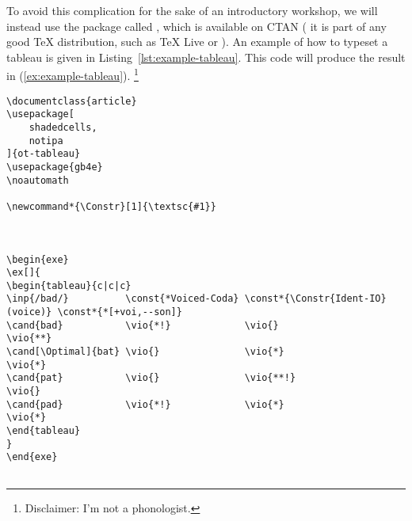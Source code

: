 To avoid this complication for the sake of an introductory workshop, we will instead use the package called , which is available on CTAN (\IE{} it is part of any good \TeX{} distribution, such as TeX Live or ).
An example of how to typeset a tableau is given in Listing~\ref{lst:example-tableau}.
This code will produce the result in (\ref{ex:example-tableau}).%
\footnote{%
Disclaimer: I'm not a phonologist.%
}

\begin{exe}
    \label{ex:example-tableau}
\end{exe}

\begin{listing}[htbp]
	\centering
	\begin{verbatim}
\documentclass{article}
\usepackage[
    shadedcells,
    notipa
]{ot-tableau}
\usepackage{gb4e}
\noautomath

\newcommand*{\Constr}[1]{\textsc{#1}}



\begin{exe}
\ex[]{
\begin{tableau}{c|c|c}
\inp{/bad/}          \const{*Voiced-Coda} \const*{\Constr{Ident-IO}(voice)} \const*{*[+voi,--son]}
\cand{bad}           \vio{*!}             \vio{}                            \vio{**}
\cand[\Optimal]{bat} \vio{}               \vio{*}                           \vio{*}
\cand{pat}           \vio{}               \vio{**!}                         \vio{}
\cand{pad}           \vio{*!}             \vio{*}                           \vio{*}
\end{tableau}
}
\end{exe}


	\end{verbatim}
	\caption{An example of an OT tableau}
	\label{lst:example-tableau}
\end{listing}